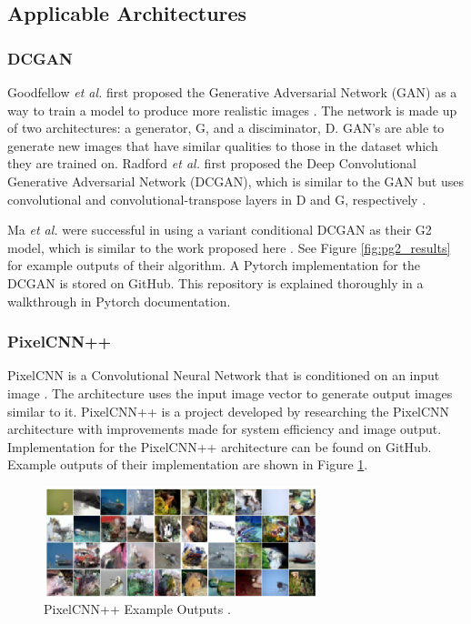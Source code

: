 \documentclass[letterpaper]{article} %
\begin{document}
\subsection{Applicable Architectures}
\subsubsection{DCGAN}
Goodfellow \textit{et al.} first proposed the Generative Adversarial Network (GAN)
as a way to train a model to produce more realistic images
\cite{generative_adversarial_networks}.
The network is made up of two architectures:
a generator, G, and a disciminator, D.
GAN's are able to generate new images that have similar qualities to
those in the dataset which they are trained on.
Radford \textit{et al.} first proposed the Deep Convolutional Generative Adversarial Network (DCGAN),
which is similar to the GAN
but uses convolutional and convolutional-transpose layers in D and G, respectively
\cite{unsupervised_learning}.

Ma \textit{et al.} were successful in using
a variant conditional DCGAN as their G2 model, which is similar to the work proposed here
\cite{pose_guided_image_generation}.
See Figure \ref{fig:pg2_results} for example outputs of their algorithm.
A Pytorch implementation for the DCGAN is stored on GitHub.
This repository is explained thoroughly in a walkthrough
in Pytorch documentation.

\subsubsection{PixelCNN++}
PixelCNN is a Convolutional Neural Network that is conditioned on an input image
\cite{conditional_image_generation}.
The architecture uses the input image vector to generate output images similar to it.
PixelCNN++ \cite{pixelcnn++} is a project developed by researching the
PixelCNN architecture with improvements made
for system efficiency and image output.
Implementation for the PixelCNN++ architecture can be found on GitHub.
Example outputs of their implementation are shown in Figure \ref{fig:pixelcnn++}.

\begin{figure}[htbp]
\centerline{\includegraphics[width=8cm]{pixelcnn++.png}}
\caption{PixelCNN++ Example Outputs \cite{pixelcnn++}.}
\label{fig:pixelcnn++}
\end{figure}
\end{document}
